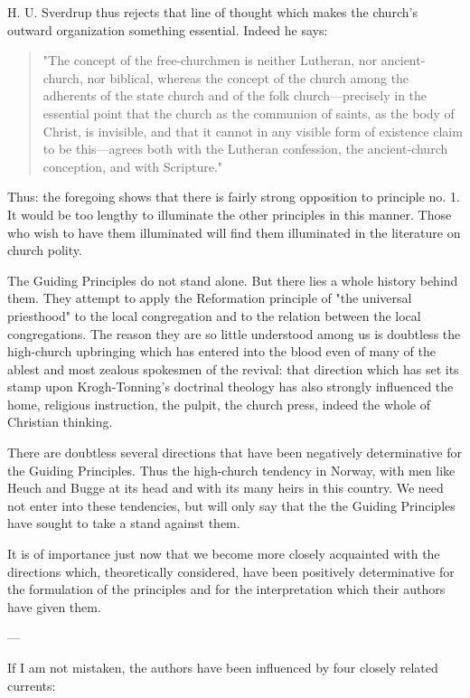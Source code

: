 H. U. Sverdrup thus rejects that line of thought which makes the church’s outward organization something essential. Indeed he says:

\begin{quote}
"The concept of the free-churchmen is neither Lutheran, nor ancient-church, nor biblical, whereas the concept of the church among the adherents of the state church and of the folk church—precisely in the essential point that the church as the communion of saints, as the body of Christ, is invisible, and that it cannot in any visible form of existence claim to be this—agrees both with the Lutheran confession, the ancient-church conception, and with Scripture."
\end{quote}

Thus: the foregoing shows that there is fairly strong opposition to principle no. 1. It would be too lengthy to illuminate the other principles in this manner. Those who wish to have them illuminated will find them illuminated in the literature on church polity.

The Guiding Principles do not stand alone. But there lies a whole history behind them. They attempt to apply the Reformation principle of "the universal priesthood" to the local congregation and to the relation between the local congregations. The reason they are so little understood among us is doubtless the high-church upbringing which has entered into the blood even of many of the ablest and most zealous spokesmen of the revival: that direction which has set its stamp upon Krogh-Tonning’s doctrinal theology has also strongly influenced the home, religious instruction, the pulpit, the church press, indeed the whole of Christian thinking.

There are doubtless several directions that have been negatively determinative for the Guiding Principles. Thus the high-church tendency in Norway, with men like Heuch and Bugge at its head and with its many heirs in this country. We need not enter into these tendencies, but will only say that the the Guiding Principles have sought to take a stand against them.

It is of importance just now that we become more closely acquainted with the directions which, theoretically considered, have been positively determinative for the formulation of the principles and for the interpretation which their authors have given them.

---

If I am not mistaken, the authors have been influenced by four closely related currents:

